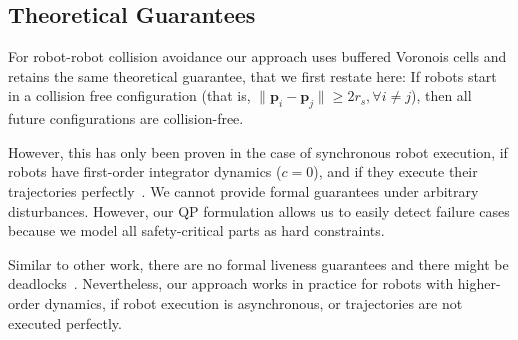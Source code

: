 \documentclass{svproc}
\newcommand{\vp}{\mathbf{p}}
\begin{document}

\subsection{Theoretical Guarantees} %

For robot-robot collision avoidance our approach uses buffered Voronois cells and retains the same theoretical guarantee, that we first restate here:
If robots start in a collision free configuration (that is, $\|\vp_i - \vp_j\| \geq 2r_s, \forall i\neq j$), then all future configurations are collision-free.

However, this has only been proven in the case of synchronous robot execution, if robots have first-order integrator dynamics ($c=0$), and if they execute their trajectories perfectly~\cite{bufferedVoronoiCells}.
We cannot provide formal guarantees under arbitrary disturbances.
However, our QP formulation allows us to easily detect failure cases because we model all safety-critical parts as hard constraints.

Similar to other work, there are no formal liveness guarantees and there might be deadlocks~\cite{bufferedVoronoiCells}.
Nevertheless, our approach works in practice for robots with higher-order dynamics, if robot execution is asynchronous, or trajectories are not executed perfectly.




\end{document}
